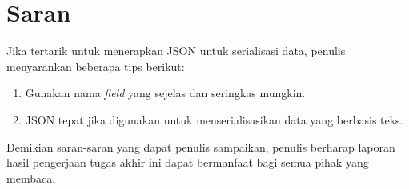 \documentclass[a4paper, 12pt, oneside]{report}
\begin{document}
\section{Saran}

Jika tertarik untuk menerapkan JSON untuk serialisasi data, penulis menyarankan beberapa tips berikut:

\begin{enumerate}
  \item Gunakan nama \textit{field} yang sejelas dan seringkas mungkin.
  \item JSON tepat jika digunakan untuk menserialisasikan data yang berbasis teks.
\end{enumerate}

Demikian saran-saran yang dapat penulis sampaikan, penulis berharap laporan hasil pengerjaan tugas akhir ini dapat bermanfaat bagi semua pihak yang membaca.

\onehalfspacing 
\end{document}
